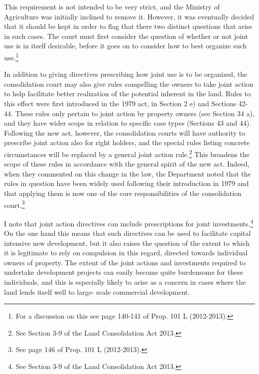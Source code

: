 This requirement is not intended to be very strict, and the Ministry of Agriculture was initially inclined to remove it. However, it was eventually decided that it should be kept in order to flag that there two distinct questions that arise in such cases. The court must first consider the question of whether or not joint use is in itself desirable, before it goes on to consider how to best organize such use.\footnote{For a discussion on this see page 140-141 of Prop. 101 L (2012-2013).}

In addition to giving directives prescribing how joint use is to be organized, the consolidation court may also give rules compelling the owners to take joint action to help facilitate better realization of the potential inherent in the land. Rules to this effect were first introduced in the 1979 act, in Section 2 e) and Sections 42-44. These rules only pertain to joint action by property owners (see Section 34 a), and they have wider scope in relation to specific case types (Sections 43 and 44). Following the new act, however, the consolidation courts will have authority to prescribe joint action also for right holders, and the special rules listing concrete circumstances will be replaced by a general joint action rule.\footnote{See Section 3-9 of the Land Consolidation Act 2013.} This broadens the scope of these rules in accordance with the general spirit of the new act. Indeed, when they commented on this change in the law, the Department noted that the rules in question have been widely used following their introduction in 1979 and that applying them is now one of the core responsibilities of the consolidation court.\footnote{See page 146 of Prop. 101 L (2012-2013).}

I note that joint action directives can include prescriptions for joint investments.\footnote{See Section 3-9 of the Land Consolidation Act 2013.} On the one hand this means that such directives can be used to facilitate capital intensive new development, but it also raises the question of the extent to which it is legitimate to rely on compulsion in this regard, directed towards individual owners of property. The extent of the joint actions and investments required to undertake development projects can easily become quite burdensome for these individuals, and this is especially likely to arise as a concern in cases where the land lends itself well to large- scale commercial development.


